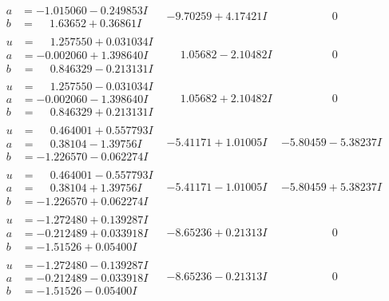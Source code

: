 \documentclass[1p]{elsarticle_modified}
\theoremstyle{definition}
\begin{document}
$$\begin{array}{c|c|c}
\begin{aligned}
a &= -1.015060 - 0.249853 I \\
b &= \phantom{-}1.63652 + 0.36861 I\end{aligned}
 & -9.70259 + 4.17421 I & \phantom{-0.000000 } 0 \\ \hline\begin{aligned}
u &= \phantom{-}1.257550 + 0.031034 I \\
a &= -0.002060 + 1.398640 I \\
b &= \phantom{-}0.846329 - 0.213131 I\end{aligned}
 & \phantom{-}1.05682 - 2.10482 I & \phantom{-0.000000 } 0 \\ \hline\begin{aligned}
u &= \phantom{-}1.257550 - 0.031034 I \\
a &= -0.002060 - 1.398640 I \\
b &= \phantom{-}0.846329 + 0.213131 I\end{aligned}
 & \phantom{-}1.05682 + 2.10482 I & \phantom{-0.000000 } 0 \\ \hline\begin{aligned}
u &= \phantom{-}0.464001 + 0.557793 I \\
a &= \phantom{-}0.38104 - 1.39756 I \\
b &= -1.226570 - 0.062274 I\end{aligned}
 & -5.41171 + 1.01005 I & -5.80459 - 5.38237 I \\ \hline\begin{aligned}
u &= \phantom{-}0.464001 - 0.557793 I \\
a &= \phantom{-}0.38104 + 1.39756 I \\
b &= -1.226570 + 0.062274 I\end{aligned}
 & -5.41171 - 1.01005 I & -5.80459 + 5.38237 I \\ \hline\begin{aligned}
u &= -1.272480 + 0.139287 I \\
a &= -0.212489 + 0.033918 I \\
b &= -1.51526 + 0.05400 I\end{aligned}
 & -8.65236 + 0.21313 I & \phantom{-0.000000 } 0 \\ \hline\begin{aligned}
u &= -1.272480 - 0.139287 I \\
a &= -0.212489 - 0.033918 I \\
b &= -1.51526 - 0.05400 I\end{aligned}
 & -8.65236 - 0.21313 I & \phantom{-0.000000 } 0 \\ \hline\begin{aligned}

\end{aligned}
\end{array}$$
\end{document}
